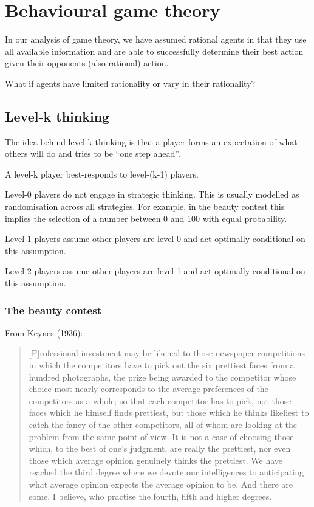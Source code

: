 \documentclass[
  letterpaper,
  DIV=11,
  numbers=noendperiod]{scrreprt}
\begin{document}
\part{Behavioural game theory}

In our analysis of game theory, we have assumed rational agents in that
they use all available information and are able to successfully
determine their best action given their opponents (also rational)
action.

What if agents have limited rationality or vary in their rationality?

\hypertarget{level-k-thinking}{%
\chapter{Level-k thinking}\label{level-k-thinking}}

The idea behind level-k thinking is that a player forms an expectation
of what others will do and tries to be ``one step ahead''.

A level-k player best-responds to level-(k-1) players.

Level-0 players do not engage in strategic thinking. This is usually
modelled as randomisation across all strategies. For example, in the
beauty contest this implies the selection of a number between 0 and 100
with equal probability.

Level-1 players assume other players are level-0 and act optimally
conditional on this assumption.

Level-2 players assume other players are level-1 and act optimally
conditional on this assumption.

\hypertarget{the-beauty-contest}{%
\section{The beauty contest}\label{the-beauty-contest}}

From Keynes (1936):

\begin{quote}
{[}P{]}rofessional investment may be likened to those newspaper
competitions in which the competitors have to pick out the six prettiest
faces from a hundred photographs, the prize being awarded to the
competitor whose choice most nearly corresponds to the average
preferences of the competitors as a whole; so that each competitor has
to pick, not those faces which he himself finds prettiest, but those
which he thinks likeliest to catch the fancy of the other competitors,
all of whom are looking at the problem from the same point of view. It
is not a case of choosing those which, to the best of one's judgment,
are really the prettiest, nor even those which average opinion genuinely
thinks the prettiest. We have reached the third degree where we devote
our intelligences to anticipating what average opinion expects the
average opinion to be. And there are some, I believe, who practise the
fourth, fifth and higher degrees.
\end{quote}
\end{document}
